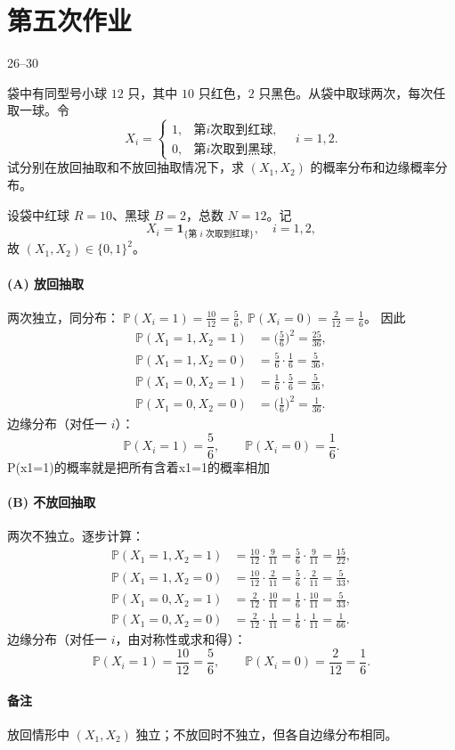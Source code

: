 \section{第五次作业}
26--30

\begin{homework}[26]
袋中有同型号小球 $12$ 只，其中 $10$ 只红色，$2$ 只黑色。从袋中取球两次，每次任取一球。令
\[
X_i =
\begin{cases}
1, & 第 i 次取到红球, \\
0, & 第 i 次取到黑球,
\end{cases}
\quad i=1,2.
\]
试分别在放回抽取和不放回抽取情况下，求 $(X_1, X_2)$ 的概率分布和边缘概率分布。
\end{homework}

\begin{solution}
设袋中红球 $R=10$、黑球 $B=2$，总数 $N=12$。记
\[
X_i=\mathbf{1}_{\{\text{第 $i$ 次取到红球}\}},\quad i=1,2,
\]
故 $(X_1,X_2)\in\{0,1\}^2$。

\paragraph{(A) 放回抽取}
两次独立，同分布：$\;\mathbb{P}(X_i=1)=\frac{10}{12}=\frac56,\ \mathbb{P}(X_i=0)=\frac{2}{12}=\frac16$。
因此
\[
\begin{aligned}
\mathbb{P}(X_1=1,X_2=1)&=\Big(\frac56\Big)^2=\frac{25}{36},\\
\mathbb{P}(X_1=1,X_2=0)&=\frac56\cdot\frac16=\frac{5}{36},\\
\mathbb{P}(X_1=0,X_2=1)&=\frac16\cdot\frac56=\frac{5}{36},\\
\mathbb{P}(X_1=0,X_2=0)&=\Big(\frac16\Big)^2=\frac{1}{36}.
\end{aligned}
\]
边缘分布（对任一 $i$）：
\[
\mathbb{P}(X_i=1)=\frac56,\qquad \mathbb{P}(X_i=0)=\frac16.
\]
P(x1=1)的概率就是把所有含着x1=1的概率相加
\paragraph{(B) 不放回抽取}
两次不独立。逐步计算：
\[
\begin{aligned}
\mathbb{P}(X_1=1,X_2=1)&=\frac{10}{12}\cdot\frac{9}{11}=\frac56\cdot\frac{9}{11}=\frac{15}{22},\\
\mathbb{P}(X_1=1,X_2=0)&=\frac{10}{12}\cdot\frac{2}{11}=\frac56\cdot\frac{2}{11}=\frac{5}{33},\\
\mathbb{P}(X_1=0,X_2=1)&=\frac{2}{12}\cdot\frac{10}{11}=\frac16\cdot\frac{10}{11}=\frac{5}{33},\\
\mathbb{P}(X_1=0,X_2=0)&=\frac{2}{12}\cdot\frac{1}{11}=\frac16\cdot\frac{1}{11}=\frac{1}{66}.
\end{aligned}
\]
边缘分布（对任一 $i$，由对称性或求和得）：
\[
\mathbb{P}(X_i=1)=\frac{10}{12}=\frac56,\qquad \mathbb{P}(X_i=0)=\frac{2}{12}=\frac16.
\]

\paragraph{备注}
放回情形中 $(X_1,X_2)$ 独立；不放回时不独立，但各自边缘分布相同。
\end{solution}

